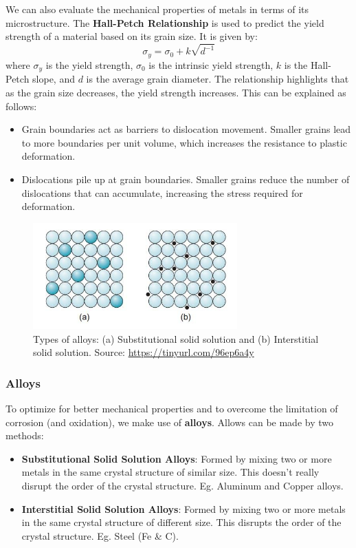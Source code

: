 \documentclass[12pt]{article}
\begin{document}
We can also evaluate the mechanical properties of metals in terms of its
microstructure. The \textbf{Hall-Petch Relationship} is used to predict the
yield strength of a material based on its grain size. It is given by:
\begin{equation}
    \sigma_y = \sigma_0 + k \sqrt{d^{-1}}
\end{equation}
where $\sigma_y$ is the yield strength, $\sigma_0$ is the intrinsic yield strength, $k$ is the Hall-Petch slope, and $d$ is the average grain diameter. The relationship highlights that as the grain size decreases, the yield strength increases. This can be explained as follows:
\begin{itemize}
    \item Grain boundaries act as barriers to dislocation movement. Smaller grains lead
          to more boundaries per unit volume, which increases the resistance to plastic
          deformation.
    \item Dislocations pile up at grain boundaries. Smaller grains reduce the number of
          dislocations that can accumulate, increasing the stress required for
          deformation.
\end{itemize}

\begin{figure}[htbp]
    \centering
    \includegraphics[width=0.7\textwidth]{figures/chapter_2/alloys_types.jpeg}
    \caption{Types of alloys: (a) Substitutional solid solution and (b) Interstitial solid solution. Source: \url{https://tinyurl.com/96ep6a4y}}\label{fig:alloy_types}
\end{figure}

\subsubsection{Alloys}
To optimize for better mechanical properties and to overcome the limitation of
corrosion (and oxidation), we make use of \textbf{alloys}. Allows can be made
by two methods:
\begin{itemize}
    \item \textbf{Substitutional Solid Solution Alloys}: Formed by mixing two or more metals in the same crystal structure of similar size. This doesn't really disrupt the order of the crystal structure. Eg. Aluminum and Copper alloys.
    \item \textbf{Interstitial Solid Solution Alloys}: Formed by mixing two or more metals in the same crystal structure of different size. This disrupts the order of the crystal structure. Eg. Steel (Fe \& C).
\end{itemize}
\end{document}

